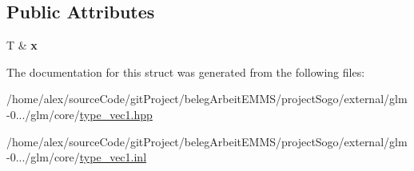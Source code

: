 \subsection*{Public Attributes}
\begin{DoxyCompactItemize}
\item 
\hypertarget{structglm_1_1detail_1_1tref1_a622e46b4e2d963116983cfc13b8c84ed}{T \& {\bfseries x}}\label{structglm_1_1detail_1_1tref1_a622e46b4e2d963116983cfc13b8c84ed}

\end{DoxyCompactItemize}


The documentation for this struct was generated from the following files\-:\begin{DoxyCompactItemize}
\item 
/home/alex/source\-Code/git\-Project/beleg\-Arbeit\-E\-M\-M\-S/project\-Sogo/external/glm-\/0.../glm/core/\hyperlink{type__vec1_8hpp}{type\-\_\-vec1.\-hpp}\item 
/home/alex/source\-Code/git\-Project/beleg\-Arbeit\-E\-M\-M\-S/project\-Sogo/external/glm-\/0.../glm/core/\hyperlink{type__vec1_8inl}{type\-\_\-vec1.\-inl}\end{DoxyCompactItemize}
